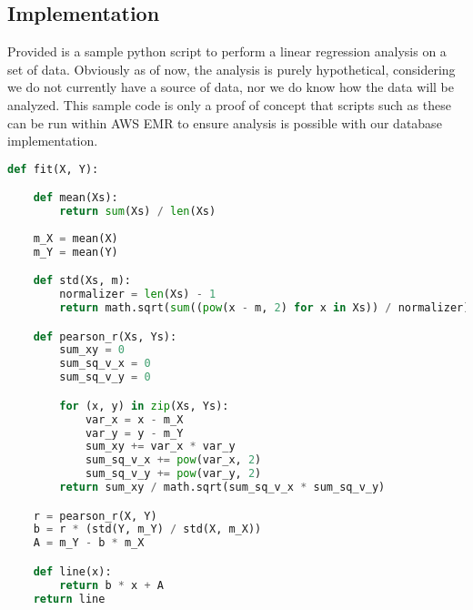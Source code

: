     \subsection{Implementation}
    Provided is a sample python script to perform a linear regression analysis on a set of data. Obviously as of now, the analysis is purely hypothetical, considering we do not currently have a source of data, nor we do know how the data will be analyzed. This sample code is only a proof of concept that scripts such as these can be run within AWS EMR to ensure analysis is possible with our database implementation.
    
\begin{lstlisting}[language=Python, caption=Sample EMR linear regression analysis example\cite{i5}]
def fit(X, Y):

    def mean(Xs):
        return sum(Xs) / len(Xs)
        
    m_X = mean(X)
    m_Y = mean(Y)

    def std(Xs, m):
        normalizer = len(Xs) - 1
        return math.sqrt(sum((pow(x - m, 2) for x in Xs)) / normalizer)

    def pearson_r(Xs, Ys):
        sum_xy = 0
        sum_sq_v_x = 0
        sum_sq_v_y = 0

        for (x, y) in zip(Xs, Ys):
            var_x = x - m_X
            var_y = y - m_Y
            sum_xy += var_x * var_y
            sum_sq_v_x += pow(var_x, 2)
            sum_sq_v_y += pow(var_y, 2)
        return sum_xy / math.sqrt(sum_sq_v_x * sum_sq_v_y)

    r = pearson_r(X, Y)
    b = r * (std(Y, m_Y) / std(X, m_X))
    A = m_Y - b * m_X

    def line(x):
        return b * x + A
    return line
\end{lstlisting}